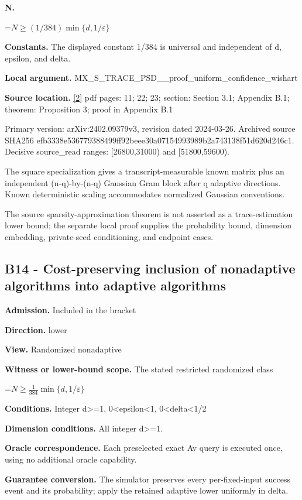 \documentclass[10pt,a4paper]{article}
\newcommand{\AtlasMath}[1]{\par\begingroup\centering\setbox0=\hbox{$\displaystyle #1$}\ifdim\wd0>1.4\linewidth\typeout{ATLAS WIDE FORMULA: \the\wd0}\fi\ifdim\wd0>\linewidth\resizebox{\linewidth}{!}{\box0}\else\box0\fi\par\endgroup}
\begin{document}
\textbf{N.}

\AtlasMath{N\ge(1/384)\min\{d,1/\varepsilon\}}
\textbf{Constants.} The displayed constant 1/384 is universal and independent of d, epsilon, and delta.

\textbf{Local argument.} MX\_\allowbreak{}S\_\allowbreak{}TRACE\_\allowbreak{}PSD\_\allowbreak{}\_\allowbreak{}proof\_\allowbreak{}uniform\_\allowbreak{}confidence\_\allowbreak{}wishart

\textbf{Source location.} \href{https://arxiv.org/pdf/2402.09379v3}{[2]} pdf pages: 11; 22; 23; section: Section 3.1; Appendix B.1; theorem: Proposition 3; proof in Appendix B.1

Primary version: arXiv:2402.09379v3, revision dated 2024-03-26. Archived source SHA256 efb3338e536779388499ff92beee30a07154993989b2a743138f51d620d246c1. Decisive source\_\allowbreak{}read ranges: [26800,31000) and [51800,59600).

The square specialization gives a transcript-measurable known matrix plus an independent (n-q)-by-(n-q) Gaussian Gram block after q adaptive directions. Known deterministic scaling accommodates normalized Gaussian conventions.

The source sparsity-approximation theorem is not asserted as a trace-estimation lower bound; the separate local proof supplies the probability bound, dimension embedding, private-seed conditioning, and endpoint cases.

\subsection{B14 - Cost-preserving inclusion of nonadaptive algorithms into adaptive algorithms}
\textbf{Admission.} Included in the bracket

\textbf{Direction.} lower

\textbf{View.} Randomized nonadaptive

\textbf{Witness or lower-bound scope.} The stated restricted randomized class

\AtlasMath{N\ge\frac{1}{384}\min\{d,1/\varepsilon\}}
\textbf{Conditions.} Integer d>=1, 0<epsilon<1, 0<delta<1/2

\textbf{Dimension conditions.} All integer d>=1.

\textbf{Oracle correspondence.} Each preselected exact Av query is executed once, using no additional oracle capability.

\textbf{Guarantee conversion.} The simulator preserves every per-fixed-input success event and its probability; apply the retained adaptive lower uniformly in delta.
\end{document}
